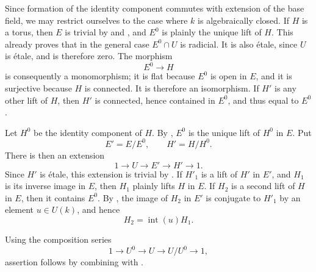 Since formation of the identity component commutes with extension
of the base field, we may restrict ourselves to the case where
\(k\) is algebraically closed.  If \(H\) is a torus, then \(E\)
is trivial by  and , and \(E^0\) is plainly the
unique lift of \(H\).  This already proves that in the general
case \(E^0\cap U\) is radicial.  It is also étale, since \(U\) is
étale, and is therefore zero.  The morphism
\[
  E^0\longrightarrow H
\]
is consequently a monomorphism; it is flat because \(E^0\) is
open in \(E\), and it is surjective because \(H\) is connected.
It is therefore an isomorphism.  If \(H'\) is any other lift of
\(H\), then \(H'\) is connected, hence contained in \(E^0\), and
thus equal to \(E^0\).

Let \(H^0\) be the identity component of \(H\).  By , \(E^0\)
is the unique lift of \(H^0\) in \(E\).  Put
\[
  E'=E/E^0,\qquad H'=H/H^0.
\]
There is then an extension
\[
  1\longrightarrow U\longrightarrow E'
    \longrightarrow H'\longrightarrow1.
\]
Since \(H'\) is étale, this extension is trivial by
.  If \(H'_1\) is a lift of \(H'\) in \(E'\), and
\(H_1\) is its inverse image in \(E\), then \(H_1\) plainly
lifts \(H\) in \(E\).  If \(H_2\) is a second lift of \(H\) in
\(E\), then it contains \(E^0\).  By , the image of
\(H_2\) in \(E'\) is conjugate to \(H'_1\) by an element
\(u\in U(k)\), and hence
\[
  H_2=\operatorname{int}(u)H_1.
\]


Using the composition series
\[
  1\longrightarrow U^0\longrightarrow U
    \longrightarrow U/U^0\longrightarrow1,
\]
assertion  follows by combining  with .

